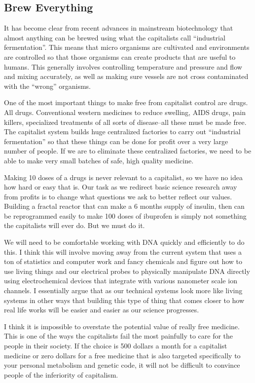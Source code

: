 \subsection{Brew Everything}\label{brew-everything}

It has become clear from recent advances in mainstream biotechnology
that almost anything can be brewed using what the capitalists call
``industrial fermentation''. This means that micro organisms are
cultivated and environments are controlled so that those organisms can
create products that are useful to humans. This generally involves
controlling temperature and pressure and flow and mixing accurately, as
well as making sure vessels are not cross contaminated with the
``wrong'' organisms.

One of the most important things to make free from capitalist control
are drugs. All drugs. Conventional western medicines to reduce swelling,
AIDS drugs, pain killers, specialized treatments of all sorts of
disease--all these must be made free. The capitalist system builds huge
centralized factories to carry out ``industrial fermentation'' so that
these things can be done for profit over a very large number of people.
If we are to eliminate these centralized factories, we need to be able
to make very small batches of safe, high quality medicine.

Making 10 doses of a drugs is never relevant to a capitalist, so we have
no idea how hard or easy that is. Our task as we redirect basic science
research away from profits is to change what questions we ask to better
reflect our values. Building a fractal reactor that can make a 6 months
supply of insulin, then can be reprogrammed easily to make 100 doses of
ibuprofen is simply not something the capitalists will ever do. But we
must do it.

We will need to be comfortable working with DNA quickly and efficiently
to do this. I think this will involve moving away from the current
system that uses a ton of statistics and computer work and fancy
chemicals and figure out how to use living things and our electrical
probes to physically manipulate DNA directly using electrochemical
devices that integrate with various nanometer scale ion channels. I
essentially argue that as our technical systems look more like living
systems in other ways that building this type of thing that comes closer
to how real life works will be easier and easier as our science
progresses.

I think it is impossible to overstate the potential value of really free
medicine. This is one of the ways the capitalists fail the most
painfully to care for the people in their society. If the choice is 500
dollars a month for a capitalist medicine or zero dollars for a free
medicine that is also targeted specifically to your personal metabolism
and genetic code, it will not be difficult to convince people of the
inferiority of capitalism.

